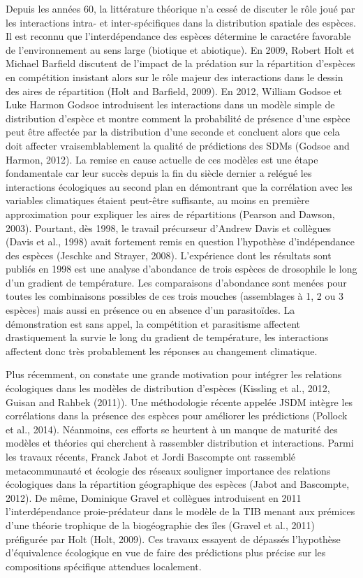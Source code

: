 Depuis les années 60, la littérature théorique n'a cessé de discuter le
rôle joué par les interactions intra- et inter-spécifiques dans la
distribution spatiale des espèces. Il est reconnu que l'interdépendance
des espèces détermine le caractére favorable de l'environnement au sens
large (biotique et abiotique). En 2009, Robert Holt et Michael Barfield
discutent de l'impact de la prédation sur la répartition d'espèces en
compétition insistant alors sur le rôle majeur des interactions dans le
dessin des aires de répartition (Holt and Barfield, 2009). En 2012,
William Godsoe et Luke Harmon Godsoe introduisent les interactions dans
un modèle simple de distribution d'espèce et montre comment la
probabilité de présence d'une espèce peut être affectée par la
distribution d'une seconde et concluent alors que cela doit affecter
vraisemblablement la qualité de prédictions des SDMs (Godsoe and Harmon,
2012). La remise en cause actuelle de ces modèles est une étape
fondamentale car leur succès depuis la fin du siècle dernier a relégué
les interactions écologiques au second plan en démontrant que la
corrélation avec les variables climatiques étaient peut-être suffisante,
au moins en première approximation pour expliquer les aires de
répartitions (Pearson and Dawson, 2003). Pourtant, dès 1998, le travail
précurseur d'Andrew Davis et collègues (Davis et al., 1998) avait
fortement remis en question l'hypothèse d'indépendance des espèces
(Jeschke and Strayer, 2008). L'expérience dont les résultats sont
publiés en 1998 est une analyse d'abondance de trois espèces de
drosophile le long d'un gradient de température. Les comparaisons
d'abondance sont menées pour toutes les combinaisons possibles de ces
trois mouches (assemblages à 1, 2 ou 3 espèces) mais aussi en présence
ou en absence d'un parasitoïdes. La démonstration est sans appel, la
compétition et parasitisme affectent drastiquement la survie le long du
gradient de température, les interactions affectent donc très
probablement les réponses au changement climatique.

Plus récemment, on constate une grande motivation pour intégrer les
relations écologiques dans les modèles de distribution d'espèces
(Kissling et al., 2012, Guisan and Rahbek (2011)). Une méthodologie
récente appelée JSDM intègre les corrélations dans la présence des
espèces pour améliorer les prédictions (Pollock et al., 2014).
Néanmoins, ces efforts se heurtent à un manque de maturité des modèles
et théories qui cherchent à rassembler distribution et interactions.
Parmi les travaux récents, Franck Jabot et Jordi Bascompte ont rassemblé
metacommunauté et écologie des réseaux souligner importance des
relations écologiques dans la répartition géographique des espèces
(Jabot and Bascompte, 2012). De même, Dominique Gravel et collègues
introduisent en 2011 l'interdépendance proie-prédateur dans le modèle de
la TIB menant aux prémices d'une théorie trophique de la biogéographie
des îles (Gravel et al., 2011) préfigurée par Holt (Holt, 2009). Ces
travaux essayent de dépassés l'hypothèse d'équivalence écologique en vue
de faire des prédictions plus précise sur les compositions spécifique
attendues localement.


